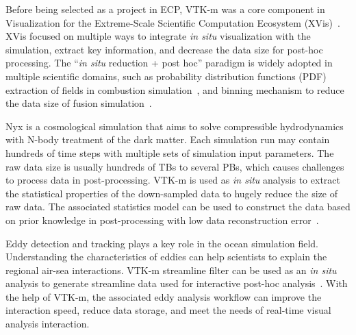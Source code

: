 Before being selected as a project in ECP, VTK-m was a core component in Visualization for the Extreme-Scale Scientific Computation Ecosystem (XVis)~\cite{osti1547341}. 
XVis focused on multiple ways to integrate \emph{in situ} visualization with the simulation, extract key information, and decrease the data size for post-hoc processing.
The ``\emph{in situ} reduction + post hoc'' paradigm is widely adopted in multiple scientific domains, such as probability distribution functions (PDF) extraction of fields in combustion simulation~\cite{7874311}, and binning mechanism to reduce the data size of fusion simulation~\cite{KressCKCCP18}. 


Nyx is a cosmological simulation that aims to solve compressible hydrodynamics with N-body treatment of the dark matter. Each simulation run may contain hundreds of time steps with multiple sets of simulation input parameters. The raw data size is usually hundreds of TBs to several PBs, which causes challenges to process data in post-processing. 
VTK-m is used as \emph{in situ} analysis to extract the statistical properties of the down-sampled data to hugely reduce the size of raw data. The associated statistics model can be used to construct the data based on prior knowledge in post-processing with low data reconstruction error~\cite{wang2019statistical}.

Eddy detection and tracking plays a key role in the ocean simulation field. Understanding the characteristics of eddies can help scientists to explain the regional air-sea interactions.
VTK-m streamline filter can be used as an \emph{in situ} analysis to generate streamline data used for interactive post-hoc analysis~\cite{han2022narrative}. With the help of VTK-m, the associated eddy analysis workflow can improve the interaction speed, reduce data storage, and meet the
needs of real-time visual analysis interaction.  